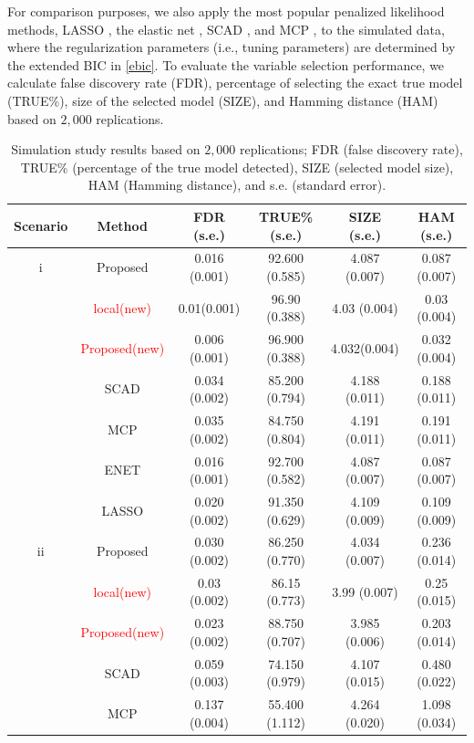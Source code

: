 \documentclass[12pt]{article}
\begin{document}
For comparison purposes, we also apply the most popular penalized likelihood methods, LASSO \citep{tibshirani1996regression}, the elastic net \citep{zou2005regularization}, SCAD \citep{fan2001variable}, and MCP \citep{zhang2010nearly}, to the simulated data, where the regularization parameters (i.e., tuning parameters) are determined by the extended BIC in \eqref{ebic}. To evaluate the variable selection performance, we calculate false discovery rate (FDR), percentage of selecting the exact true model (TRUE\%), size of the selected model (SIZE), and Hamming distance (HAM) based on $2,000$ replications.


\begin{table}[H]
  \centering
  \caption{Simulation study results based on $2,000$ replications; FDR (false discovery rate), TRUE\% (percentage of the true model detected), SIZE (selected model size), HAM (Hamming distance), and s.e. (standard error).}\label{T:sim1}
  \begin{tabular}{cc|c|c|c|c}
    \hline
    Scenario&Method&FDR  (s.e.) & TRUE\% (s.e.) & SIZE (s.e.) & HAM (s.e.)  \\
    \hline
i&Proposed & 0.016 (0.001) & 92.600 (0.585)& 4.087 (0.007) & 0.087 (0.007) \\ 
&\textcolor{red}{local(new)}& 0.01(0.001) & 96.90 (0.388) & 4.03  (0.004) & 0.03 (0.004) \\
&\textcolor{red}{Proposed(new)} & 0.006 (0.001)& 96.900 (0.388) & 4.032(0.004) & 0.032 (0.004) \\
    &SCAD & 0.034 (0.002) &  85.200 (0.794) & 4.188 (0.011) & 0.188 (0.011)\\ 
   &MCP & 0.035 (0.002) & 84.750 (0.804) & 4.191 (0.011) & 0.191 (0.011)\\ 
  &ENET & 0.016 (0.001) & 92.700 (0.582) & 4.087 (0.007) & 0.087 (0.007)\\ 
  &LASSO & 0.020 (0.002) & 91.350 (0.629) & 4.109 (0.009) & 0.109 (0.009)\\
    \hline
    ii&Proposed & 0.030 (0.002) & 86.250 (0.770) & 4.034 (0.007) & 0.236 (0.014)   \\
    &\textcolor{red}{local(new)}& 0.03  (0.002) &  86.15  (0.773) & 3.99 (0.007) & 0.25  (0.015)\\
    &\textcolor{red}{Proposed(new)}& 0.023  (0.002) & 88.750  (0.707) & 3.985  (0.006) & 0.203 (0.014) \\
&SCAD & 0.059 (0.003) & 74.150 (0.979) & 4.107 (0.015) & 0.480 (0.022) \\ 
  &MCP & 0.137 (0.004) & 55.400 (1.112) & 4.264 (0.020) & 1.098 (0.034) \\ 

\end{tabular}
\end{table}
\end{document}
